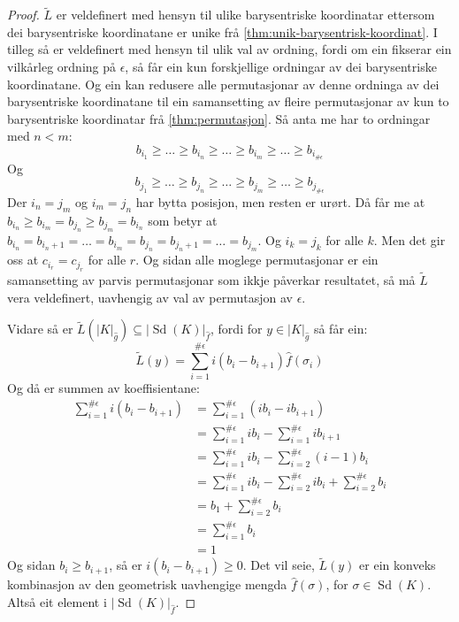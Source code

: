 \documentclass[a4paper, 12pt, norsk]{article}
\theoremstyle{plain}
\theoremstyle{definition}
\newcommand{\gr}[1]{ \lvert #1 \rvert } %
\newcommand{\tuple}[1]{ \left( #1 \right) } %
\DeclareMathOperator{\Sd}{Sd}
\begin{document}
\begin{proof}
	\( \tilde{L} \) er veldefinert med hensyn til ulike barysentriske koordinatar ettersom dei barysentriske koordinatane er unike frå \autoref{thm:unik-barysentrisk-koordinat}. I tilleg så er veldefinert med hensyn til ulik val av ordning, fordi om ein fikserar ein vilkårleg ordning på \( \epsilon \), så får ein kun forskjellige ordningar av dei barysentriske koordinatane. Og ein kan redusere alle permutasjonar av denne ordninga av dei barysentriske koordinatane til ein samansetting av fleire permutasjonar av kun to barysentriske koordinatar frå \autoref{thm:permutasjon}. Så anta me har to ordningar med \( n < m \):
	\[
		b_{i_1} \geq \dots \geq b_{i_n} \geq \dots \geq b_{i_m} \geq \dots \geq b_{i_{\#\epsilon}}
	\]
	Og
	\[
		b_{j_1} \geq \dots \geq b_{j_n} \geq \dots \geq b_{j_m} \geq \dots \geq b_{j_{\#\epsilon}}
	\]
	Der \( i_n=j_m \) og \( i_m=j_n \) har bytta posisjon, men resten er urørt. Då får me at \( b_{i_n} \geq b_{i_m}=b_{j_n} \geq b_{j_m}=b_{i_n} \) som betyr at \( b_{i_n} = b_{i_n+1} = \dots = b_{i_m}=b_{j_n}=b_{j_n+1}=\dots=b_{j_m} \). Og \( i_k = j_k \) for alle \( k \). Men det gir oss at \( c_{i_r} = c_{j_r} \) for alle \( r \). Og sidan alle moglege permutasjonar er ein samansetting av parvis permutasjonar som ikkje påverkar resultatet, så må \( \tilde{L} \) vera veldefinert, uavhengig av val av permutasjon av \( \epsilon \).

	Vidare så er \( \tilde{L}(\gr{K}_{\hat{g}}) \subseteq \gr{\Sd(K)}_{\hat{f}} \), fordi for \( y \in \gr{K}_{\hat{g}} \) så får ein:
	\[
		\tilde{L}(y) = \sum_{i=1}^{\#\epsilon}i\tuple{b_i-b_{i+1}}\hat{f}(\sigma_i)
	\]
	Og då er summen av koeffisientane:
	\begin{align*}
		\sum_{i=1}^{\#\epsilon}i\tuple{b_i-b_{i+1}} &= \sum_{i=1}^{\#\epsilon}\tuple{ib_i-ib_{i+1}} \\
		&= \sum_{i=1}^{\#\epsilon}i b_i - \sum_{i=1}^{\#\epsilon}i b_{i+1} \\
		&= \sum_{i=1}^{\#\epsilon}i b_i - \sum_{i=2}^{\#\epsilon}\tuple{i-1}b_{i} \\
		&= \sum_{i=1}^{\#\epsilon}i b_i - \sum_{i=2}^{\#\epsilon}i b_{i} + \sum_{i=2}^{\#\epsilon}b_i \\
		&= b_1 + \sum_{i=2}^{\#\epsilon} b_i \\
		&= \sum_{i=1}^{\#\epsilon} b_i \\
		&= 1
	\end{align*}
	Og sidan \( b_i \geq b_{i+1} \), så er \( i\tuple{b_i-b_{i+1}} \geq 0 \). Det vil seie, \( \tilde{L}(y) \) er ein konveks kombinasjon av den geometrisk uavhengige mengda \( \hat{f}(\sigma) \), for \( \sigma \in \Sd(K) \). Altså eit element i \( \gr{\Sd(K)}_{\hat{f}} \).


\end{proof}
\end{document}
